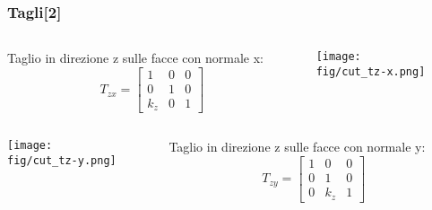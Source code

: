 \begin{frame}
\frametitle{Tagli[2]}
\begin{columns}
\begin{column}{0.48\textwidth}
Taglio in direzione z sulle facce con normale x:
\begin{equation}
T_{zx}=\begin{bmatrix}
    1 & 0 & 0\\
    0 & 1 & 0\\
    k_z & 0 & 1
    \end{bmatrix}
\end{equation}
\end{column}
\begin{column}{0.48\textwidth}
\texttt{[image: \\fig/cut\_tz-x.png]}
\end{column}
\end{columns}
%
\begin{columns}
\begin{column}{0.48\textwidth}
\texttt{[image: \\fig/cut\_tz-y.png]}
\end{column}
\begin{column}{0.48\textwidth}
Taglio in direzione z sulle facce con normale y:
\begin{equation}
T_{zy}=\begin{bmatrix}
    1 & 0 & 0\\
    0 & 1 & 0\\
    0 & k_z & 1
    \end{bmatrix}
\end{equation}
\end{column}
\end{columns}
\end{frame}
%
